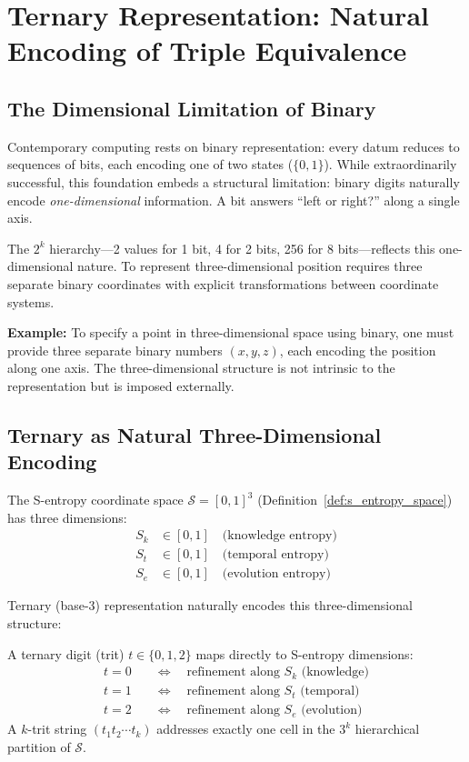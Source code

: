 \section{Ternary Representation: Natural Encoding of Triple Equivalence}
\label{sec:ternary}

\subsection{The Dimensional Limitation of Binary}

Contemporary computing rests on binary representation: every datum reduces to sequences of bits, each encoding one of two states ($\{0, 1\}$). While extraordinarily successful, this foundation embeds a structural limitation: binary digits naturally encode \textit{one-dimensional} information. A bit answers ``left or right?'' along a single axis.

The $2^k$ hierarchy—2 values for 1 bit, 4 for 2 bits, 256 for 8 bits—reflects this one-dimensional nature. To represent three-dimensional position requires three separate binary coordinates with explicit transformations between coordinate systems.

\textbf{Example:} To specify a point in three-dimensional space using binary, one must provide three separate binary numbers $(x, y, z)$, each encoding the position along one axis. The three-dimensional structure is not intrinsic to the representation but is imposed externally.

\subsection{Ternary as Natural Three-Dimensional Encoding}

The S-entropy coordinate space $\mathcal{S} = [0,1]^3$ (Definition~\ref{def:s_entropy_space}) has three dimensions:
\begin{align}
S_k &\in [0,1] \quad \text{(knowledge entropy)} \\
S_t &\in [0,1] \quad \text{(temporal entropy)} \\
S_e &\in [0,1] \quad \text{(evolution entropy)}
\end{align}

Ternary (base-3) representation naturally encodes this three-dimensional structure:

\begin{theorem}
\label{thm:trit_coordinate}
A ternary digit (trit) $t \in \{0, 1, 2\}$ maps directly to S-entropy dimensions:
\begin{align}
t = 0 &\quad \Leftrightarrow \quad \text{refinement along } S_k \text{ (knowledge)} \\
t = 1 &\quad \Leftrightarrow \quad \text{refinement along } S_t \text{ (temporal)} \\
t = 2 &\quad \Leftrightarrow \quad \text{refinement along } S_e \text{ (evolution)}
\end{align}
A $k$-trit string $(t_1 t_2 \cdots t_k)$ addresses exactly one cell in the $3^k$ hierarchical partition of $\mathcal{S}$.
\end{theorem}

